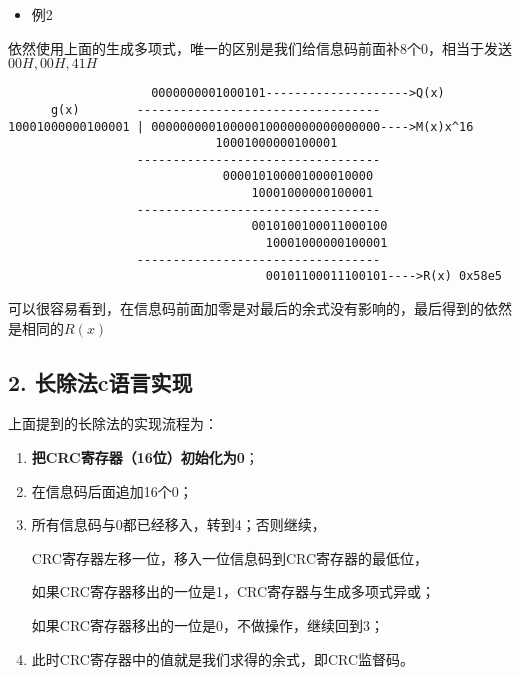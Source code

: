 \documentclass[
]{article}
\begin{document}
\begin{itemize}
\item
  例2
\end{itemize}

依然使用上面的生成多项式，唯一的区别是我们给信息码前面补8个0，相当于发送$00H,00H,41H$

\begin{verbatim}
                    0000000001000101-------------------->Q(x)
      g(x)        ----------------------------------
10001000000100001 | 00000000010000010000000000000000---->M(x)x^16
                             10001000000100001
                  ----------------------------------
                              000010100001000010000
                                  10001000000100001
                  ----------------------------------
                                  0010100100011000100
                                    10001000000100001
                  ----------------------------------
                                    00101100011100101---->R(x) 0x58e5
\end{verbatim}

可以很容易看到，在信息码前面加零是对最后的余式没有影响的，最后得到的依然是相同的$R(x)$

\hypertarget{header-n109}{%
\subsection{2. 长除法c语言实现}\label{header-n109}}

上面提到的长除法的实现流程为：

\begin{enumerate}
\def\labelenumi{\arabic{enumi}.}
\item
  \textbf{把CRC寄存器（16位）初始化为0}；
\item
  在信息码后面追加16个0；
\item
  所有信息码与0都已经移入，转到4；否则继续，

  CRC寄存器左移一位，移入一位信息码到CRC寄存器的最低位，

  如果CRC寄存器移出的一位是1，CRC寄存器与生成多项式异或；

  如果CRC寄存器移出的一位是0，不做操作，继续回到3；
\item
  此时CRC寄存器中的值就是我们求得的余式，即CRC监督码。
\end{enumerate}
\end{document}
